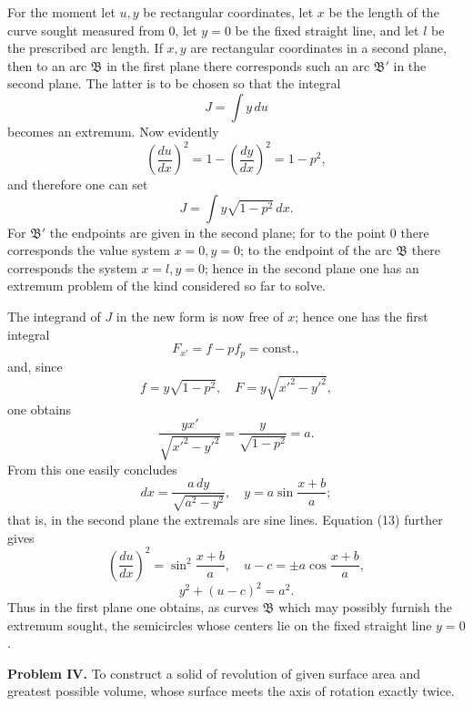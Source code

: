 \documentclass[11pt,a4paper,leqno]{article}
\begin{document}
For the moment let $u,y$ be rectangular coordinates, let $x$ be the length of the curve sought measured from 0, let $y=0$ be the fixed straight line, and let $l$ be the prescribed arc length. If $x,y$ are rectangular coordinates in a second plane, then to an arc $\mathfrak{B}$ in the first plane there corresponds such an arc $\mathfrak{B}'$ in the second plane. The latter is to be chosen so that the integral
\[
J=\int y\,du
\]
becomes an extremum. Now evidently
\begin{equation}\tag{13}
\left(\frac{du}{dx}\right)^2=1-\left(\frac{dy}{dx}\right)^2=1-p^2,
\end{equation}
and therefore one can set
\[
J=\int y\sqrt{1-p^2}\,dx.
\]
For $\mathfrak{B}'$ the endpoints are given in the second plane; for to the point 0 there corresponds the value system $x=0,y=0$; to the endpoint of the arc $\mathfrak{B}$ there corresponds the system $x=l,y=0$; hence in the second plane one has an extremum problem of the kind considered so far to solve.

The integrand of $J$ in the new form is now free of $x$; hence one has the first integral
\[
F_{x'}=f-pf_p=\mathrm{const.},
\]
and, since
\[
f=y\sqrt{1-p^2},\quad F=y\sqrt{x'^2-y'^2},
\]
one obtains
\[
\frac{yx'}{\sqrt{x'^2-y'^2}}=\frac{y}{\sqrt{1-p^2}}=a.
\]
From this one easily concludes
\[
dx=\frac{a\,dy}{\sqrt{a^2-y^2}},\quad y=a\sin\frac{x+b}{a};
\]
that is, in the second plane the extremals are sine lines. Equation (13) further gives
\[
\left(\frac{du}{dx}\right)^2=\sin^2\frac{x+b}{a},\quad u-c=\pm a\cos\frac{x+b}{a},
\]
\[
y^2+(u-c)^2=a^2.
\]
Thus in the first plane one obtains, as curves $\mathfrak{B}$ which may possibly furnish the extremum sought, the semicircles whose centers lie on the fixed straight line $y=0$.

\medskip
\noindent\textbf{Problem IV.} To construct a solid of revolution of given surface area and greatest possible volume, whose surface meets the axis of rotation exactly twice.
\end{document}
